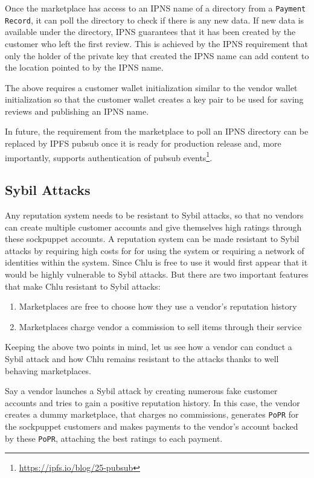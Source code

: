 \documentclass[a4paper]{article}
\begin{document}
Once the marketplace has access to an IPNS name of a directory from a
\texttt{Payment Record}, it can poll the directory to check if there
is any new data. If new data is available under the directory, IPNS
guarantees that it has been created by the customer who left the first
review. This is achieved by the IPNS requirement that only the holder
of the private key that created the IPNS name can add content to the
location pointed to by the IPNS name.

The above requires a customer wallet initialization similar to the
vendor wallet initialization so that the customer wallet creates a key
pair to be used for saving reviews and publishing an IPNS name.

In future, the requirement from the marketplace to poll an IPNS
directory can be replaced by IPFS pubsub once it is ready for
production release and, more importantly, supports authentication of
pubsub events\footnote{\url{https://ipfs.io/blog/25-pubsub}}.

\subsection{Sybil Attacks}

Any reputation system needs to be resistant to Sybil attacks, so that
no vendors can create multiple customer accounts and give themselves
high ratings through these sockpuppet accounts. A reputation system
can be made resistant to Sybil attacks by requiring high costs for for
using the system or requiring a network of identities within the
system. Since Chlu is free to use it would first appear that it would
be highly vulnerable to Sybil attacks. But there are two important
features that make Chlu resistant to Sybil attacks:

\begin{enumerate}
\item Marketplaces are free to choose how they use a vendor's reputation
  history
\item Marketplaces charge vendor a commission to sell items through
  their service
\end{enumerate}

Keeping the above two points in mind, let us see how a vendor can
conduct a Sybil attack and how Chlu remains resistant to the attacks
thanks to well behaving marketplaces.

Say a vendor launches a Sybil attack by creating numerous fake
customer accounts and tries to gain a positive reputation history. In
this case, the vendor creates a dummy marketplace, that charges no
commissions, generates \texttt{PoPR} for the sockpuppet customers and
makes payments to the vendor's account backed by these \texttt{PoPR},
attaching the best ratings to each payment.
\end{document}
